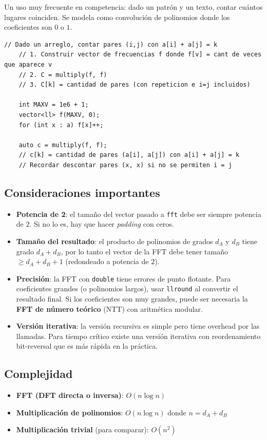 Un uso muy frecuente en competencia: dado un patrón y un texto, contar cuántos lugares coinciden. Se modela como convolución de polinomios donde los coeficientes son $0$ o $1$.

\begin{lstlisting}[style=cppstyle, caption={Contar sumas de pares con FFT (frecuencias)}]
    // Dado un arreglo, contar pares (i,j) con a[i] + a[j] = k
    // 1. Construir vector de frecuencias f donde f[v] = cant de veces que aparece v
    // 2. C = multiply(f, f)
    // 3. C[k] = cantidad de pares (con repeticion e i=j incluidos)

    int MAXV = 1e6 + 1;
    vector<ll> f(MAXV, 0);
    for (int x : a) f[x]++;

    auto c = multiply(f, f);
    // c[k] = cantidad de pares (a[i], a[j]) con a[i] + a[j] = k
    // Recordar descontar pares (x, x) si no se permiten i = j
\end{lstlisting}

\subsection{Consideraciones importantes}

\begin{itemize}
    \item \textbf{Potencia de 2}: el tamaño del vector pasado a \texttt{fft} debe ser siempre potencia de $2$. Si no lo es, hay que hacer \textit{padding} con ceros.
    \item \textbf{Tamaño del resultado}: el producto de polinomios de grados $d_A$ y $d_B$ tiene grado $d_A + d_B$, por lo tanto el vector de la FFT debe tener tamaño $\geq d_A + d_B + 1$ (redondeado a potencia de $2$).
    \item \textbf{Precisión}: la FFT con \texttt{double} tiene errores de punto flotante. Para coeficientes grandes (o polinomios largos), usar \texttt{llround} al convertir el resultado final. Si los coeficientes son muy grandes, puede ser necesaria la \textbf{FFT de número teórico} (NTT) con aritmética modular.
    \item \textbf{Versión iterativa}: la versión recursiva es simple pero tiene overhead por las llamadas. Para tiempo crítico existe una versión iterativa con reordenamiento bit-reversal que es más rápida en la práctica.
\end{itemize}

\subsection{Complejidad}

\begin{itemize}
    \item \textbf{FFT (DFT directa o inversa)}: $O(n \log n)$
    \item \textbf{Multiplicación de polinomios}: $O(n \log n)$ donde $n = d_A + d_B$
    \item \textbf{Multiplicación trivial} (para comparar): $O(n^2)$
\end{itemize}
